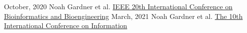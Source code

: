 {October, 2020}
{Noah Gardner et al.}
{\href{https://ieeexplore.ieee.org/servlet/opac?punumber=9287816}
    {IEEE 20th International Conference on Bioinformatics and Bioengineering}
}
\newline
{}
{March, 2021}
{Noah Gardner et al.}
{\href{http://www.information-iii.org/}
    {The 10th International Conference on Information}
}
